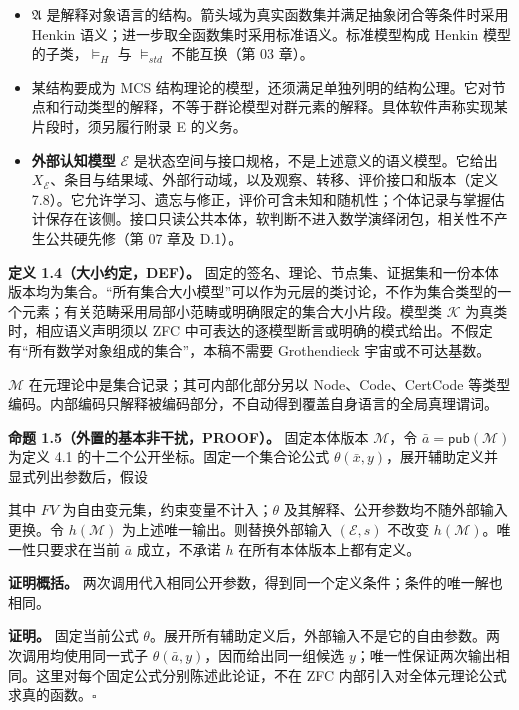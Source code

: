 \documentclass[UTF8,a4paper,zihao=-4,fontset=windows,openany]{ctexbook}
\newcommand{\mcsdisplay}[1]{%
  \par\addvspace{0.7em}%
  \sbox{\mcsmathbox}{\ensuremath{\displaystyle #1}}%
  \ifdim\wd\mcsmathbox>\linewidth
    \noindent\resizebox{\linewidth}{!}{\usebox{\mcsmathbox}}%
  \else
    \noindent\hspace*{\fill}\usebox{\mcsmathbox}\hspace*{\fill}%
  \fi
  \par\addvspace{0.7em}%
}
\def\ensuremath#1{#1}%
\def\operatorname#1{#1}%
\def\mathrm#1{#1}%
\begin{document}
\begin{itemize}
\item \(\mathfrak A\) 是解释对象语言的结构。箭头域为真实函数集并满足抽象闭合等条件时采用 Henkin 语义；进一步取全函数集时采用标准语义。标准模型构成 Henkin 模型的子类，\(\models_H\) 与 \(\models_{\mathrm{std}}\) 不能互换（第 03 章）。
\item 某结构要成为 MCS 结构理论的模型，还须满足单独列明的结构公理。它对节点和行动类型的解释，不等于群论模型对群元素的解释。具体软件声称实现某片段时，须另履行附录 E 的义务。
\item \textbf{外部认知模型} \(\mathcal E\) 是状态空间与接口规格，不是上述意义的语义模型。它给出 \(X_{\mathcal E}\)、条目与结果域、外部行动域，以及观察、转移、评价接口和版本（定义 7.8）。它允许学习、遗忘与修正，评价可含未知和随机性；个体记录与掌握估计保存在该侧。接口只读公共本体，软判断不进入数学演绎闭包，相关性不产生公共硬先修（第 07 章及 D.1）。
\end{itemize}
\textbf{定义 1.4（大小约定，DEF）。} 固定的签名、理论、节点集、证据集和一份本体版本均为集合。“所有集合大小模型”可以作为元层的类讨论，不作为集合类型的一个元素；有关范畴采用局部小范畴或明确限定的集合大小片段。模型类 \(\mathcal K\) 为真类时，相应语义声明须以 ZFC 中可表达的逐模型断言或明确的模式给出。不假定有“所有数学对象组成的集合”，本稿不需要 Grothendieck 宇宙或不可达基数。

\(\mathcal M\) 在元理论中是集合记录；其可内部化部分另以 Node、Code、CertCode 等类型编码。内部编码只解释被编码部分，不自动得到覆盖自身语言的全局真理谓词。

\textbf{命题 1.5（外置的基本非干扰，PROOF）。} 固定本体版本 \(\mathcal M\)，令 \(\bar a=\mathsf{pub}(\mathcal M)\) 为定义 4.1 的十二个公开坐标。固定一个集合论公式 \(\theta(\bar x,y)\)，展开辅助定义并显式列出参数后，假设


\mcsdisplay{\operatorname{FV}(\theta)\subseteq\{x_1,\ldots,x_k,y\},
\qquad \exists!y\,\theta(\bar a,y).}
\noindent 其中 \(\operatorname{FV}\) 为自由变元集，约束变量不计入；\(\theta\) 及其解释、公开参数均不随外部输入更换。令 \(h(\mathcal M)\) 为上述唯一输出。则替换外部输入 \((\mathcal E,s)\) 不改变 \(h(\mathcal M)\)。唯一性只要求在当前 \(\bar a\) 成立，不承诺 \(h\) 在所有本体版本上都有定义。

\textbf{证明概括。} 两次调用代入相同公开参数，得到同一个定义条件；条件的唯一解也相同。

\textbf{证明。} 固定当前公式 \(\theta\)。展开所有辅助定义后，外部输入不是它的自由参数。两次调用均使用同一式子 \(\theta(\bar a,y)\)，因而给出同一组候选 \(y\)；唯一性保证两次输出相同。这里对每个固定公式分别陈述此论证，不在 ZFC 内部引入对全体元理论公式求真的函数。\(\square\)
\end{document}
